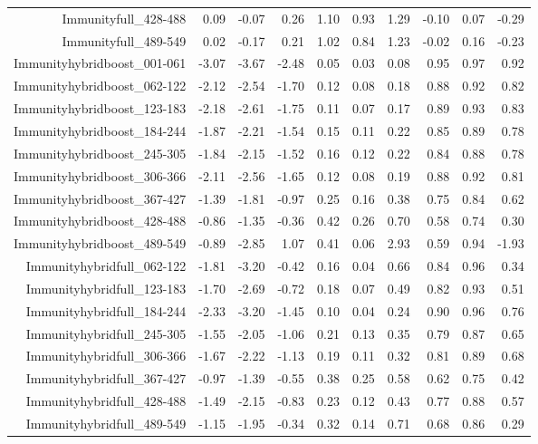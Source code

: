 \begin{table}[ht]
\begin{tabular}{rrrrrrrrrr}
  Immunityfull\_428-488 & 0.09 & -0.07 & 0.26 & 1.10 & 0.93 & 1.29 & -0.10 & 0.07 & -0.29 \\ 
  Immunityfull\_489-549 & 0.02 & -0.17 & 0.21 & 1.02 & 0.84 & 1.23 & -0.02 & 0.16 & -0.23 \\ 
  Immunityhybridboost\_001-061 & -3.07 & -3.67 & -2.48 & 0.05 & 0.03 & 0.08 & 0.95 & 0.97 & 0.92 \\ 
  Immunityhybridboost\_062-122 & -2.12 & -2.54 & -1.70 & 0.12 & 0.08 & 0.18 & 0.88 & 0.92 & 0.82 \\ 
  Immunityhybridboost\_123-183 & -2.18 & -2.61 & -1.75 & 0.11 & 0.07 & 0.17 & 0.89 & 0.93 & 0.83 \\ 
  Immunityhybridboost\_184-244 & -1.87 & -2.21 & -1.54 & 0.15 & 0.11 & 0.22 & 0.85 & 0.89 & 0.78 \\ 
  Immunityhybridboost\_245-305 & -1.84 & -2.15 & -1.52 & 0.16 & 0.12 & 0.22 & 0.84 & 0.88 & 0.78 \\ 
  Immunityhybridboost\_306-366 & -2.11 & -2.56 & -1.65 & 0.12 & 0.08 & 0.19 & 0.88 & 0.92 & 0.81 \\ 
  Immunityhybridboost\_367-427 & -1.39 & -1.81 & -0.97 & 0.25 & 0.16 & 0.38 & 0.75 & 0.84 & 0.62 \\ 
  Immunityhybridboost\_428-488 & -0.86 & -1.35 & -0.36 & 0.42 & 0.26 & 0.70 & 0.58 & 0.74 & 0.30 \\ 
  Immunityhybridboost\_489-549 & -0.89 & -2.85 & 1.07 & 0.41 & 0.06 & 2.93 & 0.59 & 0.94 & -1.93 \\ 
  Immunityhybridfull\_062-122 & -1.81 & -3.20 & -0.42 & 0.16 & 0.04 & 0.66 & 0.84 & 0.96 & 0.34 \\ 
  Immunityhybridfull\_123-183 & -1.70 & -2.69 & -0.72 & 0.18 & 0.07 & 0.49 & 0.82 & 0.93 & 0.51 \\ 
  Immunityhybridfull\_184-244 & -2.33 & -3.20 & -1.45 & 0.10 & 0.04 & 0.24 & 0.90 & 0.96 & 0.76 \\ 
  Immunityhybridfull\_245-305 & -1.55 & -2.05 & -1.06 & 0.21 & 0.13 & 0.35 & 0.79 & 0.87 & 0.65 \\ 
  Immunityhybridfull\_306-366 & -1.67 & -2.22 & -1.13 & 0.19 & 0.11 & 0.32 & 0.81 & 0.89 & 0.68 \\ 
  Immunityhybridfull\_367-427 & -0.97 & -1.39 & -0.55 & 0.38 & 0.25 & 0.58 & 0.62 & 0.75 & 0.42 \\ 
  Immunityhybridfull\_428-488 & -1.49 & -2.15 & -0.83 & 0.23 & 0.12 & 0.43 & 0.77 & 0.88 & 0.57 \\ 
  Immunityhybridfull\_489-549 & -1.15 & -1.95 & -0.34 & 0.32 & 0.14 & 0.71 & 0.68 & 0.86 & 0.29 \\ 

\end{tabular}
\end{table}
